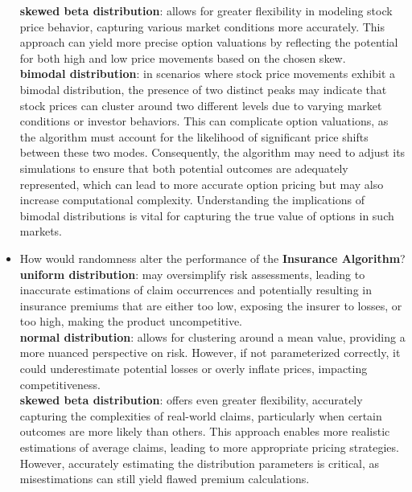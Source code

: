 \documentclass[12pt]{exam}
\begin{document}
\begin{questions}
\begin{itemize}
    \textbf{skewed beta distribution}: allows for greater flexibility in modeling stock price behavior, capturing various market conditions more accurately. This approach can yield more precise option valuations by reflecting the potential for both high and low price movements based on the chosen skew. \\

    \textbf{bimodal distribution}: in scenarios where stock price movements exhibit a bimodal distribution, the presence of two distinct peaks may indicate that stock prices can cluster around two different levels due to varying market conditions or investor behaviors. This can complicate option valuations, as the algorithm must account for the likelihood of significant price shifts between these two modes. Consequently, the algorithm may need to adjust its simulations to ensure that both potential outcomes are adequately represented, which can lead to more accurate option pricing but may also increase computational complexity. Understanding the implications of bimodal distributions is vital for capturing the true value of options in such markets. \\
    
    \item How would randomness alter the performance of the \textbf{Insurance Algorithm}?\\
    
    \textbf{uniform distribution}: may oversimplify risk assessments, leading to inaccurate estimations of claim occurrences and potentially resulting in insurance premiums that are either too low, exposing the insurer to losses, or too high, making the product uncompetitive. \\
    
    \textbf{normal distribution}: allows for clustering around a mean value, providing a more nuanced perspective on risk. However, if not parameterized correctly, it could underestimate potential losses or overly inflate prices, impacting competitiveness. \\

    \textbf{skewed beta distribution}: offers even greater flexibility, accurately capturing the complexities of real-world claims, particularly when certain outcomes are more likely than others. This approach enables more realistic estimations of average claims, leading to more appropriate pricing strategies. However, accurately estimating the distribution parameters is critical, as misestimations can still yield flawed premium calculations. \\


\end{itemize}
\end{questions}
\end{document}
